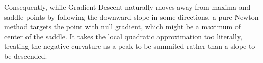 Consequently, while Gradient Descent naturally moves away from maxima and saddle points by following the downward slope in some directions, a pure Newton method targets the point with null gradient, which might be a maximum of center of the saddle. It takes the local quadratic approximation too literally, treating the negative curvature as a peak to be summited rather than a slope to be descended.

%